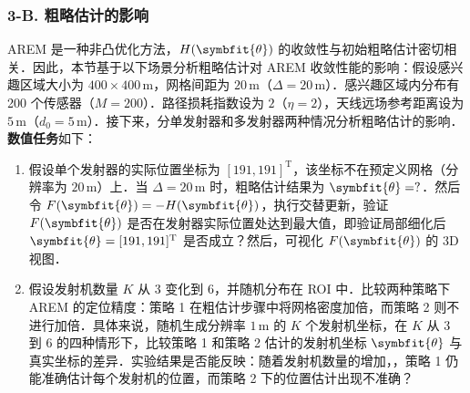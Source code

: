 \documentclass[a4paper,zihao=-4]{ctexart}
\renewcommand{\boldsymbol}[1]{\symbfit{#1}}
\begin{document}
\subsubsection*{3-B. 粗略估计的影响}

AREM 是一种非凸优化方法，$H(\boldsymbol{\theta})$ 的收敛性与初始粗略估计密切相关．因此，本节基于以下场景分析粗略估计对 AREM 收敛性能的影响：假设感兴趣区域大小为 $400 \times 400\,\mathrm{m}$，网格间距为 $20\,\mathrm{m}$（$\Delta = 20\,\mathrm{m}$）．感兴趣区域内分布有 200 个传感器（$M = 200$）．路径损耗指数设为 $2$（$\eta = 2$），天线远场参考距离设为 $5\,\mathrm{m}$（$d_0 = 5\,\mathrm{m}$）．接下来，分单发射器和多发射器两种情况分析粗略估计的影响．\textbf{数值任务}如下：

\begin{enumerate}
    \item 假设单个发射器的实际位置坐标为 $[191, 191]^\mathrm{T}$，该坐标不在预定义网格（分辨率为 $20\,\mathrm{m}$）上．当 $\Delta = 20\,\mathrm{m}$ 时，粗略估计结果为 $\boldsymbol{\theta} = ?$．然后令 $F(\boldsymbol{\theta}) = -H(\boldsymbol{\theta})$，执行交替更新，验证 $F(\boldsymbol{\theta})$ 是否在发射器实际位置处达到最大值，即验证局部细化后 $\boldsymbol{\theta} = [191, 191]^\mathrm{T}$ 是否成立？然后，可视化 $F(\boldsymbol{\theta})$ 的 3D 视图．
    \item 假设发射机数量 $K$ 从 3 变化到 6，并随机分布在 ROI 中．比较两种策略下 AREM 的定位精度：策略 1 在粗估计步骤中将网格密度加倍，而策略 2 则不进行加倍．具体来说，随机生成分辨率 $1\,\mathrm{m}$ 的 $K$ 个发射机坐标，在 $K$ 从 3 到 6 的四种情形下，比较策略 1 和策略 2 估计的发射机坐标 $\boldsymbol{\theta}$ 与真实坐标的差异．实验结果是否能反映：随着发射机数量的增加，，策略 1 仍能准确估计每个发射机的位置，而策略 2 下的位置估计出现不准确？
\end{enumerate}

\end{document}
